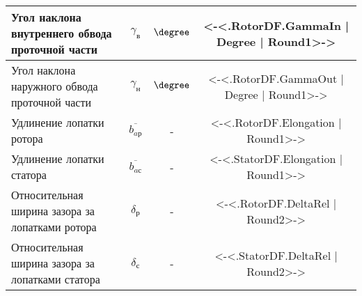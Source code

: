 \begin{center}
\begin{longtable}{|p{7cm}|c|c|c|}
		Угол наклона внутреннего обвода проточной части & $\gamma_{в}$ & $\degree$ & <-<.RotorDF.GammaIn | Degree | Round1>-> \\ \hline
		Угол наклона наружного обвода проточной части & $\gamma_{н}$ & $\degree$ & <-<.RotorDF.GammaOut | Degree | Round1>-> \\ \hline
		Удлинение лопатки ротора & $\overline{b_{aр}}$ & - & <-<.RotorDF.Elongation | Round1>-> \\ \hline
		Удлинение лопатки статора & $\overline{b_{aс}}$ & - & <-<.StatorDF.Elongation | Round1>-> \\ \hline
		Относительная ширина зазора за лопатками ротора & $\delta_р$ & - & <-<.RotorDF.DeltaRel | Round2>-> \\ \hline
		Относительная ширина зазора за лопатками статора & $\delta_с$ & - & <-<.StatorDF.DeltaRel | Round2>-> \\ \hline
	\end{longtable}
\end{center}


